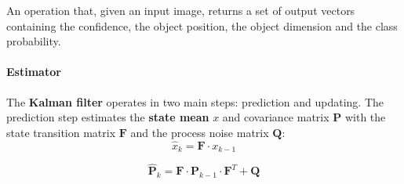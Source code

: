 {
    An operation that, given an input image, returns a set of output vectors containing the confidence, the object position, the object dimension and the class probability.
}

%

\paragraph{Estimator}

{
    The \textbf{Kalman filter}\cite{kalman1960} operates in two main steps: prediction and updating.
    The prediction step estimates the \textbf{state mean} $x$ and covariance matrix $\mathbf{P}$ with the state transition matrix $\mathbf{F}$ and the process noise matrix $\mathbf{Q}$:
}
\begin{equation}
    \label{eqn:Kalman state mean estimation}
    \hat{x}_{k} = \mathbf{F} \cdot x_{k-1}
\end{equation}

\begin{equation}
    \label{eqn:Kalman covariance matrix estimation}
    \hat{\mathbf{P}}_{k} = \mathbf{F} \cdot \mathbf{P}_{k-1} \cdot \mathbf{F}^{T} + \mathbf{Q}
\end{equation}


